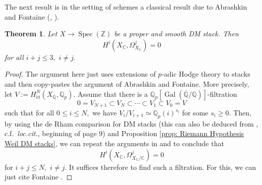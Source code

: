 \documentclass{amsart}
\newtheorem{thm}[prop]{Theorem}
\theoremstyle{definition}
\theoremstyle{remark}
\DeclareMathOperator{\Gal}{Gal}
\DeclareMathOperator{\Spec}{Spec}
\newcommand{\Q}{\mathbb{Q}}
\newcommand{\Qp}{\mathbb {Q}_p}
\newcommand{\ZZ}{\mathbb Z}
\newcommand{\et}{\operatorname{\acute{e}t}}%
\begin{document}
The next result is in the setting of schemes a classical result due to Abrashkin and Fontaine (\cite{Abrashkin90}, \cite{FontainePropreLisseZ}). 

\begin{thm}\label{thm: FontaineAbrashkinDMStacks}
    Let $X\rightarrow \Spec(\ZZ)$ be a proper and smooth DM stack. Then 
    $$
    H^{i}(X_{\mathbb{C}},\Omega^{j}_{X_{\mathbb{C}}})=0
    $$
    for all $i+j\leq 3,$ $i\neq j.$
\end{thm}

\begin{proof}
    The argument here just uses extensions of $p$-adic Hodge theory to stacks and then copy-pastes the argument of Abrashkin and Fontaine.
    More precisely, let $V:=H^{N}_{\et}(X_{\overline{\mathbb{Q}}},\mathbb{Q}_{p}).$
    Assume that there is a $\Qp[\Gal(\overline{\Q}/\Q)]$-filtration
    $$
    0=V_{N+1}\subset V_{N} \subset \cdots \subset V_{1} \subset V_{0}=V
    $$
    such that for all $0\leq i \leq N,$
    we have $V_{i}/V_{i+1}\simeq \mathbb{Q}_{p}(i)^{s_{i}}$ for some $s_{i}\geq 0$.
    Then, by using the de Rham comparison for DM stacks \cite{deRhamCompDMstacks} (this can also be deduced from \cite[Theorem 4.3.25]{KubrakPrikhodkopHodgeStacks}, c.f.\ \textit{loc.cit.}, beginning of page 9) and Proposition \ref{prop: Riemann Hypothesis Weil DM stacks},
    we can repeat the arguments in \cite[page 4]{FontainePropreLisseZ} and \cite[Proposition 5.3]{Abrashkin} to conclude that
    $$
    H^{i}(X_{\mathbb{C}},\Omega^{j}_{X_{\mathbb{C}}/\mathbb{C}})=0
    $$
    for $i+j\leq N,$ $i\neq j.$
    It suffices therefore to find such a filtration. For this, we can just cite Fontaine {\cite[Proposition 1]{FontainePropreLisseZ}}.
\end{proof}
\end{document}
